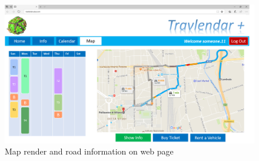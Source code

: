 \begin{figure}[H]
    \centering
    \includegraphics[scale=0.25]{Pictures/Mockups/SiteMap.png}
    \caption{Map render and road information on web page}
\end{figure}